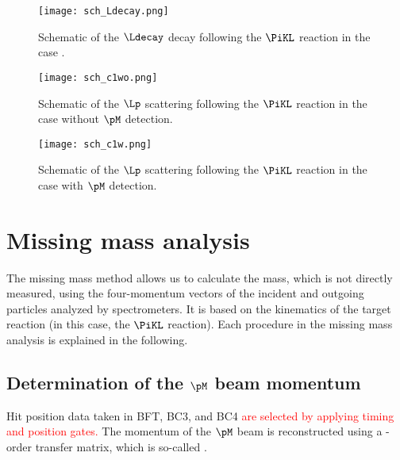 \begin{figure}[!h]
  \begin{center}
    \texttt{[image: sch\_Ldecay.png]}
    \caption{Schematic of the $\Ldecay$ decay following the $\PiKL$ reaction in the case .}
    \label{fig-sch_Ldecay}
  \end{center}
\end{figure}

\begin{figure}[!h]
  \begin{center}
    \texttt{[image: sch\_c1wo.png]}
    \caption{Schematic of the $\Lp$ scattering following the $\PiKL$ reaction in the case  without $\pM$ detection.}
    \label{fig-sch_c2wo}
  \end{center}
\end{figure}

\begin{figure}[!h]
  \begin{center}
    \texttt{[image: sch\_c1w.png]}
    \caption{Schematic of the $\Lp$ scattering following the $\PiKL$ reaction in the case  with $\pM$ detection.}
    \label{fig-sch_c2w}
  \end{center}
\end{figure}


\clearpage
\section{Missing mass analysis}
The missing mass method allows us to calculate the mass, which is not directly measured, using the four-momentum vectors of the incident and outgoing particles analyzed by spectrometers. It is based on the kinematics of the target reaction (in this case, the $\PiKL$ reaction). Each procedure in the missing mass analysis is explained in the following.

\subsection{Determination of the $\pM$ beam momentum}
Hit position data taken in BFT, BC3, and BC4 \textcolor{red}{ are selected by applying timing and position gates. } The momentum of the $\pM$ beam is reconstructed using a -order transfer matrix, which is so-called .
  
